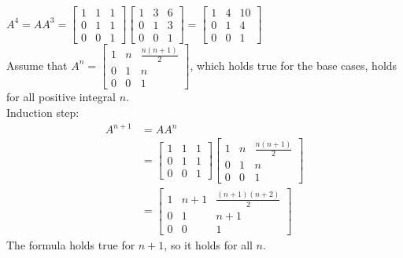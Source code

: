 \documentclass[a4paper, 12pt]{article}
\begin{document}
\begin{enumerate}
		$A^4 = AA^3 = \left[ \begin{array}{ccc}
		1 & 1 & 1 \\
		0 & 1 & 1 \\
		0 & 0 & 1 \end{array} \right]
		\left[ \begin{array}{ccc}
		1 & 3 & 6 \\
		0 & 1 & 3 \\
		0 & 0 & 1 \end{array} \right]
		= \left[ \begin{array}{ccc}
		1 & 4 & 10 \\
		0 & 1 & 4 \\
		0 & 0 & 1 \end{array} \right]$ \\
		Assume that $A^n = \left[ \begin{array}{ccc}
		1 & n & \frac{n(n + 1)}{2} \\
		0 & 1 & n \\
		0 & 0 & 1 \end{array} \right]$, which holds true for the base cases, holds for all positive integral $n$. \\
		Induction step:
		\begin{align*}
		A^{n + 1} &= AA^n \\
		&= \left[ \begin{array}{ccc}
		1 & 1 & 1 \\
		0 & 1 & 1 \\
		0 & 0 & 1 \end{array} \right]
		\left[ \begin{array}{ccc}
		1 & n & \frac{n(n + 1)}{2} \\
		0 & 1 & n \\
		0 & 0 & 1 \end{array} \right] \\
		&= \left[ \begin{array}{ccc}
		1 & n + 1 & \frac{(n + 1)(n + 2)}{2} \\
		0 & 1 & n + 1 \\
		0 & 0 & 1 \end{array} \right]
		\end{align*}
		The formula holds true for $n + 1$, so it holds for all $n$.
		

\end{enumerate}
\end{document}
